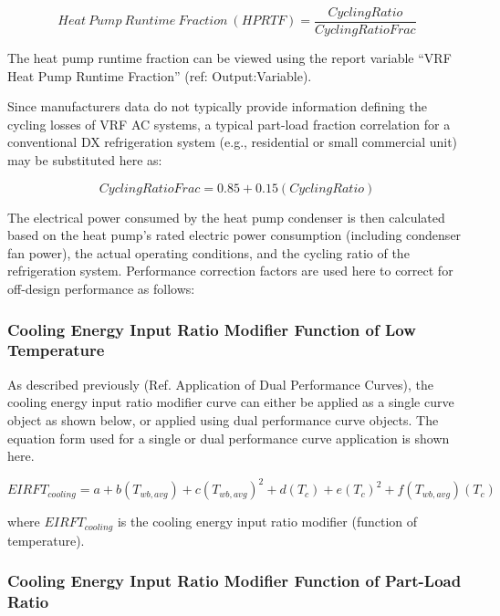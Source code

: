 \begin{equation}
  Heat~Pump~Runtime~Fraction~(HPRTF) = \frac{CyclingRatio}{CyclingRatioFrac}
\end{equation}

The heat pump runtime fraction can be viewed using the report variable ``VRF Heat Pump Runtime Fraction'' (ref: Output:Variable).

Since manufacturers data do not typically provide information defining the cycling losses of VRF AC systems, a typical part-load fraction correlation for a conventional DX refrigeration system (e.g., residential or small commercial unit) may be substituted here as:

\begin{equation}
  CyclingRatioFrac = 0.85 + 0.15(CyclingRatio)
\end{equation}

The electrical power consumed by the heat pump condenser is then calculated based on the heat pump's rated electric power consumption (including condenser fan power), the actual operating conditions, and the cycling ratio of the refrigeration system. Performance correction factors are used here to correct for off-design performance as follows:

\subsubsection{Cooling Energy Input Ratio Modifier Function of Low Temperature}\label{cooling-energy-input-ratio-modifier-function-of-low-temperature}

As described previously (Ref. Application of Dual Performance Curves), the cooling energy input ratio modifier curve can either be applied as a single curve object as shown below, or applied using dual performance curve objects. The equation form used for a single or dual performance curve application is shown here.

\begin{equation}
  EIRFT_{cooling} = a + b \left( T_{wb,avg} \right) + c \left( T_{wb,avg} \right)^2 + d \left( T_c \right) + e \left( T_c \right)^2 + f \left( T_{wb,avg} \right) \left( T_c \right)
\end{equation}

where \(EIRFT_{cooling}\) is the cooling energy input ratio modifier (function of temperature).

\subsubsection{Cooling Energy Input Ratio Modifier Function of Part-Load Ratio}\label{cooling-energy-input-ratio-modifier-function-of-part-load-ratio}

